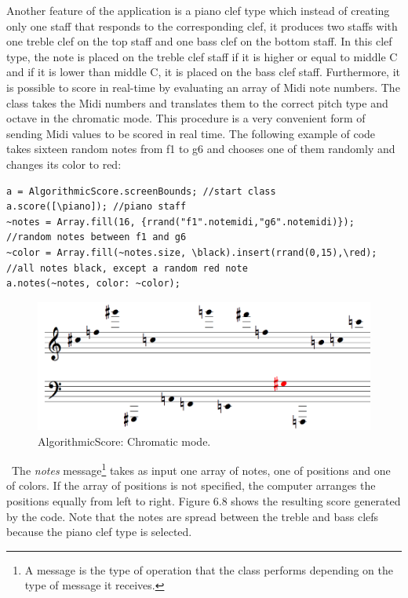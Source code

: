 Another feature of the application is a piano clef type which instead of creating only one staff that responds to the corresponding clef, it produces two staffs with one treble clef on the top staff and one bass clef on the bottom staff. In this clef type, the note is placed on the treble clef staff if it is higher or equal to middle C and if it is lower than middle C, it is placed on the bass clef staff. Furthermore, it is possible to score in real-time by evaluating an array of Midi note numbers. The class takes the Midi numbers and translates them to the correct pitch type and octave in the chromatic mode. This procedure is a very convenient form of sending Midi values to be scored in real time. The following example of code takes sixteen random notes from f1 to g6 and chooses one of them randomly and changes its color to red:
\begin{verbatim}
a = AlgorithmicScore.screenBounds; //start class
a.score([\piano]); //piano staff
~notes = Array.fill(16, {rrand("f1".notemidi,"g6".notemidi)}); 
//random notes between f1 and g6
~color = Array.fill(~notes.size, \black).insert(rrand(0,15),\red);
//all notes black, except a random red note
a.notes(~notes, color: ~color);
\end{verbatim}
\begin{figure}[htbp] %
   \centering
   \includegraphics[width=14cm]{Chapter6/algoscore2.tif} %
   \caption{AlgorithmicScore: Chromatic mode.}
   \label{fig:example}
\end{figure}\
The \emph{notes} message\footnote{A message is the type of operation that the class performs depending on the type of message it receives.} takes as input one array of notes, one of positions and one of colors. If the array of positions is not specified, the computer arranges the positions equally from left to right. Figure 6.8 shows the resulting score generated by the code. Note that the notes are spread between the treble and bass clefs because the piano clef type is selected. 

